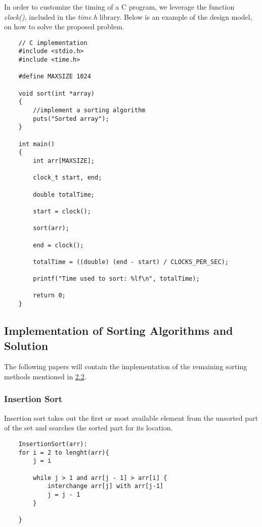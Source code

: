 \documentclass[11pt, letter paper]{article}
\begin{document}
    In order to customize the timing of a C program, we leverage the function \emph{clock()}, included in the \emph{time.h} library. Below is an example of the design model, on how to solve the proposed problem.
    
    \begin{lstlisting}
    // C implementation
    #include <stdio.h>
    #include <time.h>
    
    #define MAXSIZE 1024
    
    void sort(int *array)
    {
        //implement a sorting algorithm
        puts("Sorted array");
    }
    
    int main()
    {   
        int arr[MAXSIZE];
        
        clock_t start, end;
        
        double totalTime;

        start = clock();

        sort(arr);

        end = clock();

        totalTime = ((double) (end - start) / CLOCKS_PER_SEC);

        printf("Time used to sort: %lf\n", totalTime);

        return 0;
    }
    \end{lstlisting}
    
    \subsection{Implementation of Sorting Algorithms and Solution}
    The following papers will contain the implementation of the remaining sorting methods mentioned in \hyperref[sec:algsSorting]{2.2}.
    
        \subsubsection{Insertion Sort}
        Insertion sort takes out the first or most available element from the unsorted part of the set and searches the sorted part for its location.

        \begin{lstlisting}
    InsertionSort(arr):
    for i = 2 to lenght(arr){
        j = i

        while j > 1 and arr[j - 1] > arr[i] {
            interchange arr[j] with arr[j-1]
            j = j - 1
        }
	   
    }
        \end{lstlisting}
\end{document}
